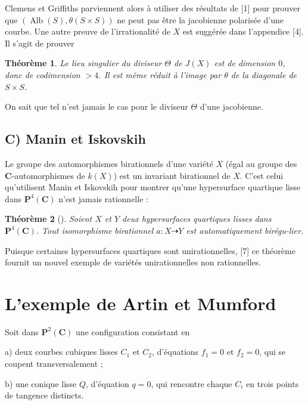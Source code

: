 \documentclass[12pt]{amsart}
\theoremstyle{plain}
\newtheorem{theoreme}{Th\'eor\`eme}[section]
\theoremstyle{definition}
\theoremstyle{remark}
\DeclareMathOperator{\Alb}{Alb}
\begin{document}
Clemens et Griffiths parviennent alors \`a utiliser des r\'esultats de [1] pour
prouver que $(\Alb(S), \theta(S \times S))$ ne peut pas \^etre la jacobienne polaris\'ee d'une
courbe. Une autre preuve de l'irrationalit\'e de $X$ est sugg\'er\'ee dans l'appendice
[4]. Il s'agit de prouver

\begin{theoreme}\label{thm:2.5}
Le lieu singulier du diviseur $\Theta$ de $J(X)$ est de dimension $0$,
donc de codimension $> 4$. Il est m\^eme r\'eduit \`a l'image par $\theta$ de la diagonale
de $S \times S$.
\end{theoreme}

On sait que tel n'est jamais le cas pour le diviseur $\Theta$ d'une jacobienne.

\subsection*{C) Manin et Iskovskih}

Le groupe des automorphismes birationnels d'une vari\'et\'e $X$ (\'egal au groupe
des $\mathbf{C}$-automorphismes de $k(X)$) est un invariant birationnel de $X$. C'est
celui qu'utilisent Manin et Iskovskih pour montrer qu'une hypersurface quartique
lisse dans $\mathbf{P}^4(\mathbf{C})$ n'est jamais rationnelle :

\begin{theoreme}[\cite{6}]\label{thm:2.6}
Soient $X$ et $Y$ deux hypersurfaces quartiques lisses dans
$\mathbf{P}^4(\mathbf{C})$. Tout isomorphisme birationnel $a: X \dashrightarrow Y$ est automatiquement bir\'egu-\linebreak lier.
\end{theoreme}

Puisque certaines hypersurfaces quartiques sont unirationnelles, [7] ce th\'eor\`eme
fournit un nouvel exemple de vari\'et\'es unirationnelles non rationnelles.

\section{L'exemple de Artin et Mumford}

Soit dans $\mathbf{P}^2(\mathbf{C})$ une configuration consistant en

a) deux courbes cubiques lisses $C_1$ et $C_2$, d'\'equations $f_1 = 0$ et $f_2 = 0$,
qui se coupent transversalement ;

b) une conique lisse $Q$, d'\'equation $q = 0$, qui rencontre chaque $C_i$ en trois
points de tangence distincts.
\end{document}

